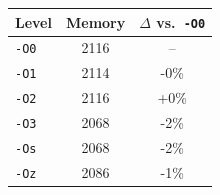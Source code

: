 \begin{tabular*}{\columnwidth}{@{\extracolsep\fill}lcc@{\extracolsep\fill}}
\toprule
\textbf{Level} & \textbf{Memory} & \textbf{$\Delta$ vs.\ \texttt{-O0}} \\
\midrule
\texttt{-O0} & 2116 & -- \\
\texttt{-O1} & 2114 & -0\% \\
\texttt{-O2} & 2116 & +0\% \\
\texttt{-O3} & 2068 & -2\% \\
\texttt{-Os} & 2068 & -2\% \\
\texttt{-Oz} & 2086 & -1\% \\
\bottomrule
\end{tabular*}
